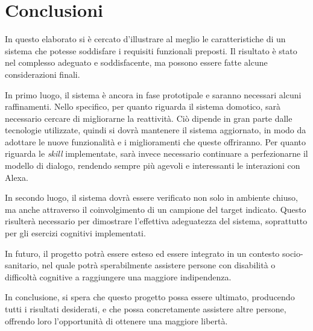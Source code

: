 
\chapter*{Conclusioni}

In questo elaborato si è cercato d'illustrare al meglio le caratteristiche di
un sistema che potesse soddisfare i requisiti funzionali preposti. Il risultato
è stato nel complesso adeguato e soddisfacente, ma possono essere fatte alcune
considerazioni finali.

In primo luogo, il sistema è ancora in fase prototipale e saranno necessari
alcuni raffinamenti. Nello specifico, per quanto riguarda il sistema domotico,
sarà necessario cercare di migliorarne la reattività. Ciò dipende in gran parte
dalle tecnologie utilizzate, quindi si dovrà mantenere il sistema aggiornato,
in modo da adottare le nuove funzionalità e i miglioramenti che queste
offriranno. Per quanto riguarda le \textit{skill} implementate, sarà invece
necessario continuare a perfezionarne il modello di dialogo, rendendo sempre
più agevoli e interessanti le interazioni con Alexa.

In secondo luogo, il sistema dovrà essere verificato non solo in ambiente
chiuso, ma anche attraverso il coinvolgimento di un campione del target
indicato. Questo risulterà necessario per dimostrare l'effettiva adeguatezza
del sistema, soprattutto per gli esercizi cognitivi implementati.

In futuro, il progetto potrà essere esteso ed essere integrato in un contesto
socio-sanitario, nel quale potrà sperabilmente assistere persone con disabilità
o difficoltà cognitive a raggiungere una maggiore indipendenza.

In conclusione, si spera che questo progetto possa essere ultimato, producendo
tutti i risultati desiderati, e che possa concretamente assistere altre
persone, offrendo loro l'opportunità di ottenere una maggiore libertà.

